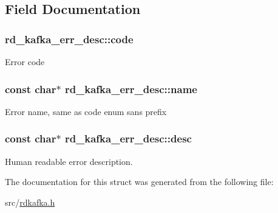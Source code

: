 \subsection{Field Documentation}
\hypertarget{structrd__kafka__err__desc_adce96ff60ac79c27f8bf1e2ccc61f9ba}{
\subsubsection[{code}]{ {\bf rd\_\-kafka\_\-err\_\-desc::code}}}
\label{structrd__kafka__err__desc_adce96ff60ac79c27f8bf1e2ccc61f9ba}
Error code \hypertarget{structrd__kafka__err__desc_a7b8578b7835261b1f27611f18d8a3477}{
\subsubsection[{name}]{\setlength{\rightskip}{0pt plus 5cm}const char$\ast$ {\bf rd\_\-kafka\_\-err\_\-desc::name}}}
\label{structrd__kafka__err__desc_a7b8578b7835261b1f27611f18d8a3477}
Error name, same as code enum sans prefix \hypertarget{structrd__kafka__err__desc_ae5c84defa6e5df1f9fba870402b4eb85}{
\subsubsection[{desc}]{\setlength{\rightskip}{0pt plus 5cm}const char$\ast$ {\bf rd\_\-kafka\_\-err\_\-desc::desc}}}
\label{structrd__kafka__err__desc_ae5c84defa6e5df1f9fba870402b4eb85}
Human readable error description. 

The documentation for this struct was generated from the following file:\begin{DoxyCompactItemize}
\item 
src/\hyperlink{rdkafka_8h}{rdkafka.h}\end{DoxyCompactItemize}
